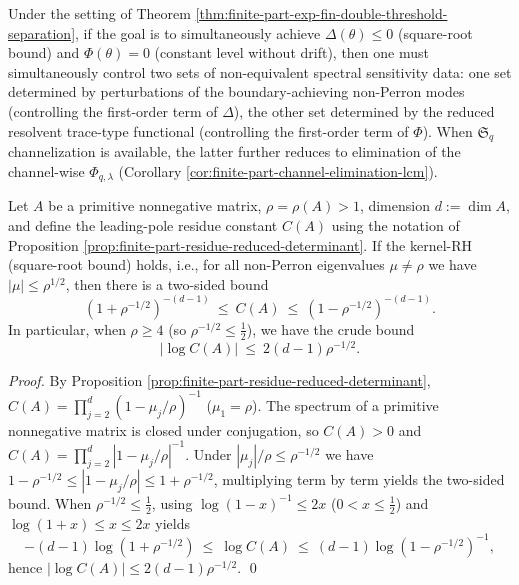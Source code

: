 \begin{corollary}\label{cor:finite-part-double-threshold-design-principle}
Under the setting of Theorem \ref{thm:finite-part-exp-fin-double-threshold-separation},
if the goal is to simultaneously achieve \(\Delta(\theta)\le 0\) (square-root bound) and \(\Phi(\theta)=0\) (constant level without drift),
then one must simultaneously control two sets of non-equivalent spectral sensitivity data: one set determined by perturbations of the boundary-achieving non-Perron modes (controlling the first-order term of \(\Delta\)), the other set determined by the reduced resolvent trace-type functional (controlling the first-order term of \(\Phi\)).
When \(\mathfrak{S}_q\) channelization is available, the latter further reduces to elimination of the channel-wise \(\Phi_{q,\lambda}\) (Corollary \ref{cor:finite-part-channel-elimination-lcm}).
\end{corollary}

\begin{proposition}\label{prop:finite-part-residue-constant-rh-squeeze}
Let \(A\) be a primitive nonnegative matrix, \(\rho=\rho(A)>1\), dimension \(d:=\dim A\), and define the leading-pole residue constant \(C(A)\) using the notation of Proposition \ref{prop:finite-part-residue-reduced-determinant}.
If the kernel-RH (square-root bound) holds, i.e., for all non-Perron eigenvalues \(\mu\neq\rho\) we have \(|\mu|\le \rho^{1/2}\), then there is a two-sided bound
\[
(1+\rho^{-1/2})^{-(d-1)}\ \le\ C(A)\ \le\ (1-\rho^{-1/2})^{-(d-1)}.
\]
In particular, when \(\rho\ge 4\) (so \(\rho^{-1/2}\le \tfrac12\)), we have the crude bound
\[
|\log C(A)|\ \le\ 2(d-1)\rho^{-1/2}.
\]
\end{proposition}

\begin{proof}
By Proposition \ref{prop:finite-part-residue-reduced-determinant},
\(
C(A)=\prod_{j=2}^{d}(1-\mu_j/\rho)^{-1}
\) (\(\mu_1=\rho\)).
The spectrum of a primitive nonnegative matrix is closed under conjugation, so \(C(A)>0\) and
\(
C(A)=\prod_{j=2}^{d}|1-\mu_j/\rho|^{-1}
\).
Under \(|\mu_j|/\rho\le \rho^{-1/2}\) we have
\(
1-\rho^{-1/2}\le |1-\mu_j/\rho|\le 1+\rho^{-1/2}
\), multiplying term by term yields the two-sided bound.
When \(\rho^{-1/2}\le\tfrac12\), using \(\log(1-x)^{-1}\le 2x\) (\(0<x\le\tfrac12\)) and \(\log(1+x)\le x\le 2x\) yields
\[
-(d-1)\log(1+\rho^{-1/2})
\ \le\ \log C(A)\ \le\ (d-1)\log(1-\rho^{-1/2})^{-1},
\]
hence \(|\log C(A)|\le 2(d-1)\rho^{-1/2}\). \qed
\end{proof}

